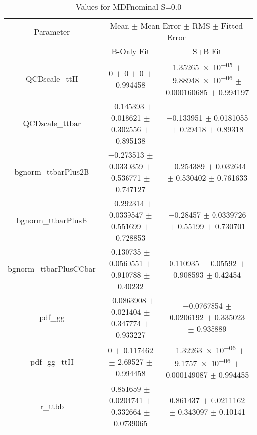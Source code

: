 \begin{table}
\centering
\caption{Values for MDFnominal S=0.0}
\begin{tabular}{ccc}
\toprule
Parameter & \multicolumn{2}{c}{Mean $\pm$ Mean Error $\pm$ RMS $\pm$ Fitted Error}\\
 & B-Only Fit & S+B Fit\\
\midrule
QCDscale\_ttH & \num{0} $\pm$ \num{0} $\pm$ \num{0} $\pm$ \num{0.994458} & \num{1.35265e-05} $\pm$ \num{9.88948e-06} $\pm$ \num{0.000160685} $\pm$ \num{0.994197}\\
QCDscale\_ttbar & \num{-0.145393} $\pm$ \num{0.018621} $\pm$ \num{0.302556} $\pm$ \num{0.895138} & \num{-0.133951} $\pm$ \num{0.0181055} $\pm$ \num{0.29418} $\pm$ \num{0.89318}\\
bgnorm\_ttbarPlus2B & \num{-0.273513} $\pm$ \num{0.0330359} $\pm$ \num{0.536771} $\pm$ \num{0.747127} & \num{-0.254389} $\pm$ \num{0.032644} $\pm$ \num{0.530402} $\pm$ \num{0.761633}\\
bgnorm\_ttbarPlusB & \num{-0.292314} $\pm$ \num{0.0339547} $\pm$ \num{0.551699} $\pm$ \num{0.728853} & \num{-0.28457} $\pm$ \num{0.0339726} $\pm$ \num{0.55199} $\pm$ \num{0.730701}\\
bgnorm\_ttbarPlusCCbar & \num{0.130735} $\pm$ \num{0.0560551} $\pm$ \num{0.910788} $\pm$ \num{0.40232} & \num{0.110935} $\pm$ \num{0.05592} $\pm$ \num{0.908593} $\pm$ \num{0.42454}\\
pdf\_gg & \num{-0.0863908} $\pm$ \num{0.021404} $\pm$ \num{0.347774} $\pm$ \num{0.933227} & \num{-0.0767854} $\pm$ \num{0.0206192} $\pm$ \num{0.335023} $\pm$ \num{0.935889}\\
pdf\_gg\_ttH & \num{0} $\pm$ \num{0.117462} $\pm$ \num{2.69527} $\pm$ \num{0.994458} & \num{-1.32263e-06} $\pm$ \num{9.1757e-06} $\pm$ \num{0.000149087} $\pm$ \num{0.994455}\\
r\_ttbb & \num{0.851659} $\pm$ \num{0.0204741} $\pm$ \num{0.332664} $\pm$ \num{0.0739065} & \num{0.861437} $\pm$ \num{0.0211162} $\pm$ \num{0.343097} $\pm$ \num{0.10141}\\
\bottomrule
\end{tabular}
\end{table}